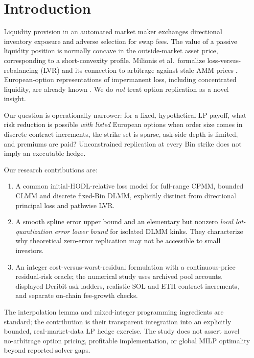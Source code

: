 \section{Introduction}
Liquidity provision in an automated market maker exchanges directional inventory exposure and adverse selection for swap fees. The value of a passive liquidity position is normally concave in the outside-market asset price, corresponding to a short-convexity profile. Milionis et al.\ formalize loss-versus-rebalancing (LVR) and its connection to arbitrage against stale AMM prices \cite{milionis2022lvr,milionis2023fees}. European-option representations of impermanent loss, including concentrated liquidity, are already known \cite{deng2023static}. We do \emph{not} treat option replication as a novel insight.

Our question is operationally narrower: for a fixed, hypothetical LP payoff, what risk reduction is possible \emph{with listed} European options when order size comes in discrete contract increments, the strike set is sparse, ask-side depth is limited, and premiums are paid? Unconstrained replication at every Bin strike does not imply an executable hedge.

Our research contributions are:
\begin{enumerate}[leftmargin=*,itemsep=2pt]
\item A common initial-HODL-relative loss model for full-range CPMM, bounded CLMM and discrete fixed-Bin DLMM, explicitly distinct from directional principal loss and pathwise LVR.
\item A smooth spline error upper bound and an elementary but nonzero \emph{local lot-quantization error lower bound} for isolated DLMM kinks. They characterize why theoretical zero-error replication may not be accessible to small investors.
\item An integer cost-versus-worst-residual formulation with a continuous-price residual-risk oracle; the numerical study uses archived pool accounts, displayed Deribit ask ladders, realistic SOL and ETH contract increments, and separate on-chain fee-growth checks.
\end{enumerate}
The interpolation lemma and mixed-integer programming ingredients are standard; the contribution is their transparent integration into an explicitly bounded, real-market-data LP hedge exercise. The study does not assert novel no-arbitrage option pricing, profitable implementation, or global MILP optimality beyond reported solver gaps.

